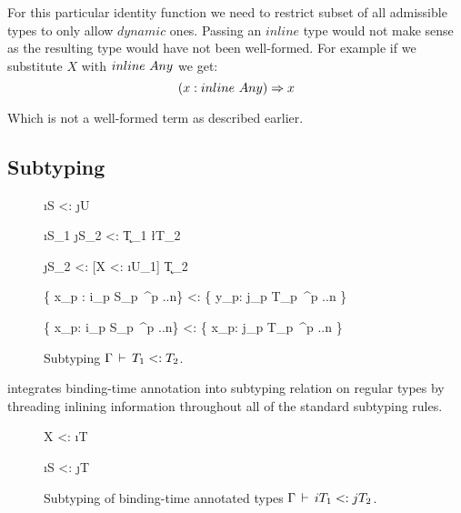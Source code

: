 For this particular identity function we need to restrict subset of all admissible
types to only allow $dynamic$ ones. Passing an $inline$ type would not make sense
as the resulting type would have not been well-formed. For example if we substitute
$X$ with $inline\ Any$ we get:
\begin{equation}\nonumber
   (x: inline\ Any) \Rightarrow x
\end{equation}

Which is not a well-formed term as described earlier.

\subsection{Subtyping}

\begin{figure}[H]


  {\Gamma \ts \i{S} <: \j{U}}

  {\Gamma \ts \i{S_1} \ra \j{S_2} <: \k{T_1} \ra \l{T_2}}

  {\Gamma \ts [X <: \i{U_1}] \ra \j{S_2} <: [X <: \i{U_1}] \ra \k{T_2}}

  {\Gamma \ts \{ x_p : i_p S_p\ ^{p ..n}\} <: \{ y_p: j_p T_p\ ^{p ..n} \} }

  {\Gamma \ts \{ x_p: i_p S_p\ ^{p ..n}\} <: \{ x_p: j_p T_p\ ^{p ..n} \}}

\caption{Subtyping $\Gamma \,\vdash\, T_1 <: T_2$.}
\end{figure}

\calculus integrates binding-time annotation into subtyping relation on regular types by
threading inlining information throughout all of the standard subtyping rules.

\begin{figure}[H]
  {\Gamma \ts X <: \i{T}}

  {\Gamma \ts \i{S} <: \j{T}}
\caption{Subtyping of binding-time annotated types $\Gamma \,\vdash\, i T_1 <: j T_2$.}
\end{figure}

